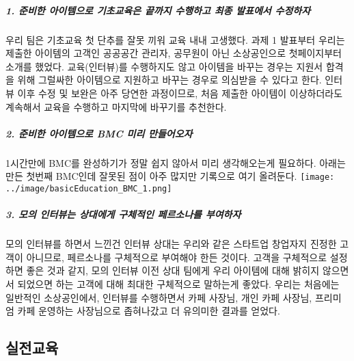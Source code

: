 \documentclass[
  letterpaper,
  DIV=11,
  numbers=noendperiod]{scrartcl}
\let\oldsubparagraph\subparagraph
\renewcommand{\subparagraph}[1]{\oldsubparagraph{#1}\mbox{}}
\begin{document}
\hypertarget{uxc900uxbe44uxd55c-uxc544uxc774uxd15cuxc73cuxb85c-uxae30uxcd08uxad50uxc721uxc740-uxb05duxae4cuxc9c0-uxc218uxd589uxd558uxace0-uxcd5cuxc885-uxbc1cuxd45cuxc5d0uxc11c-uxc218uxc815uxd558uxc790}{%
\subparagraph{1. 준비한 아이템으로 기초교육은 끝까지 수행하고 최종
발표에서
수정하자}\label{uxc900uxbe44uxd55c-uxc544uxc774uxd15cuxc73cuxb85c-uxae30uxcd08uxad50uxc721uxc740-uxb05duxae4cuxc9c0-uxc218uxd589uxd558uxace0-uxcd5cuxc885-uxbc1cuxd45cuxc5d0uxc11c-uxc218uxc815uxd558uxc790}}

우리 팀은 기초교육 첫 단추를 잘못 끼워 교육 내내 고생했다. 과제 1
발표부터 우리는 제출한 아이템의 고객인 공공공간 관리자, 공무원이 아닌
소상공인으로 첫페이지부터 소개를 했었다. 교육(인터뷰)를 수행하지도 않고
아이템을 바꾸는 경우는 지원서 합격을 위해 그럴싸한 아이템으로 지원하고
바꾸는 경우로 의심받을 수 있다고 한다. 인터뷰 이후 수정 및 보완은 아주
당연한 과정이므로, 처음 제출한 아이템이 이상하더라도 계속해서 교육을
수행하고 마지막에 바꾸기를 추천한다.

\hypertarget{uxc900uxbe44uxd55c-uxc544uxc774uxd15cuxc73cuxb85c-bmc-uxbbf8uxb9ac-uxb9ccuxb4e4uxc5b4uxc624uxc790}{%
\subparagraph{2. 준비한 아이템으로 BMC 미리
만들어오자}\label{uxc900uxbe44uxd55c-uxc544uxc774uxd15cuxc73cuxb85c-bmc-uxbbf8uxb9ac-uxb9ccuxb4e4uxc5b4uxc624uxc790}}

1시간만에 BMC를 완성하기가 정말 쉽지 않아서 미리 생각해오는게 필요하다.
아래는 만든 첫번째 BMC인데 잘못된 점이 아주 많지만 기록으로 여기
올려둔다. \texttt{[image: ../image/basicEducation\_BMC\_1.png]}

\hypertarget{uxbaa8uxc758-uxc778uxd130uxbdf0uxb294-uxc0c1uxb300uxc5d0uxac8c-uxad6cuxccb4uxc801uxc778-uxd398uxb974uxc18cuxb098uxb97c-uxbd80uxc5ecuxd558uxc790}{%
\subparagraph{3. 모의 인터뷰는 상대에게 구체적인 페르소나를
부여하자}\label{uxbaa8uxc758-uxc778uxd130uxbdf0uxb294-uxc0c1uxb300uxc5d0uxac8c-uxad6cuxccb4uxc801uxc778-uxd398uxb974uxc18cuxb098uxb97c-uxbd80uxc5ecuxd558uxc790}}

모의 인터뷰를 하면서 느낀건 인터뷰 상대는 우리와 같은 스타트업 창업자지
진정한 고객이 아니므로, 페르소나를 구체적으로 부여해야 한든 것이다.
고객을 구체적으로 설정하면 좋은 것과 같지, 모의 인터뷰 이전 상대 팀에게
우리 아이템에 대해 밝히지 않으면서 되었으면 하는 고객에 대해 최대한
구체적으로 말하는게 좋았다. 우리는 처음에는 일반적인 소상공인에서,
인터뷰를 수행하면서 카페 사장님, 개인 카페 사장님, 프리미엄 카페
운영하는 사장님으로 좁혀나갔고 더 유의미한 결과를 얻었다.

\hypertarget{uxc2e4uxc804uxad50uxc721}{%
\subsection{실전교육}\label{uxc2e4uxc804uxad50uxc721}}
\end{document}
